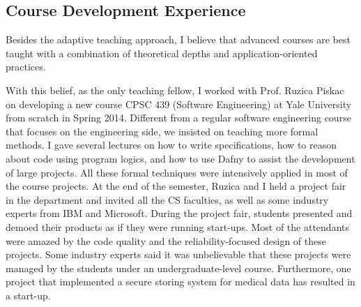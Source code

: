\documentclass[a4paper, 10pt]{article}
\begin{document}
\begin{small}
\subsection*{Course Development Experience}
Besides the adaptive teaching approach, I believe that advanced courses are best taught 
with a combination of theoretical depths
and application-oriented practices.
\begin{comment}
as well as real-world practice in applying these theories.
\end{comment}
With this belief, as the only teaching fellow, 
I worked with Prof. Ruzica Piskac on developing a new course CPSC 439 (Software Engineering) at Yale University from scratch in Spring 2014. Different from a regular software engineering course that focuses on the engineering side,
we insisted on teaching more formal methods. I gave several lectures on how to write specifications, how to reason about code using program logics, and how to use Dafny
to assist the development of large projects. 
All these formal techniques were intensively applied in most of the course projects.
At the end of the semester, Ruzica and I held a project
fair in the department and invited all the CS faculties, as well as some industry experts from IBM and Microsoft. During the project fair,
students presented and demoed their products as if they were running start-ups. Most of the attendants were amazed by the code quality and the reliability-focused design of these projects. 
Some industry experts  said
 it was unbelievable that these projects were managed by  the students under an undergraduate-level course. 
Furthermore, one project that implemented  a secure storing system for medical data has resulted in a start-up.


\end{small}
\end{document}

